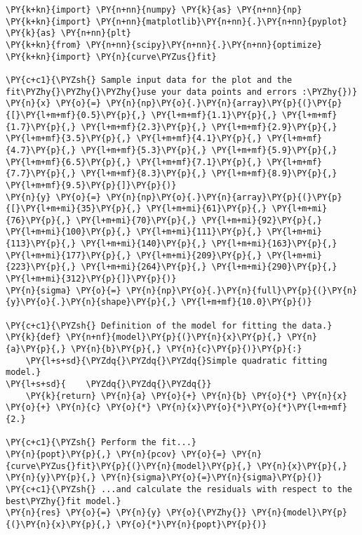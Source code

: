 \begin{Verbatim}[label=\makebox{\href{https://bitbucket.org/lbaldini/statnotes/src/master/snippets/residual\_plot.py}{https://bitbucket.org/.../residual\_plot.py}},commandchars=\\\{\}]
\PY{k+kn}{import} \PY{n+nn}{numpy} \PY{k}{as} \PY{n+nn}{np}
\PY{k+kn}{import} \PY{n+nn}{matplotlib}\PY{n+nn}{.}\PY{n+nn}{pyplot} \PY{k}{as} \PY{n+nn}{plt}
\PY{k+kn}{from} \PY{n+nn}{scipy}\PY{n+nn}{.}\PY{n+nn}{optimize} \PY{k+kn}{import} \PY{n}{curve\PYZus{}fit}

\PY{c+c1}{\PYZsh{} Sample input data for the plot and the fit\PYZhy{}\PYZhy{}\PYZhy{}use your data points and errors :\PYZhy{})}
\PY{n}{x} \PY{o}{=} \PY{n}{np}\PY{o}{.}\PY{n}{array}\PY{p}{(}\PY{p}{[}\PY{l+m+mf}{0.5}\PY{p}{,} \PY{l+m+mf}{1.1}\PY{p}{,} \PY{l+m+mf}{1.7}\PY{p}{,} \PY{l+m+mf}{2.3}\PY{p}{,} \PY{l+m+mf}{2.9}\PY{p}{,} \PY{l+m+mf}{3.5}\PY{p}{,} \PY{l+m+mf}{4.1}\PY{p}{,} \PY{l+m+mf}{4.7}\PY{p}{,} \PY{l+m+mf}{5.3}\PY{p}{,} \PY{l+m+mf}{5.9}\PY{p}{,} \PY{l+m+mf}{6.5}\PY{p}{,} \PY{l+m+mf}{7.1}\PY{p}{,} \PY{l+m+mf}{7.7}\PY{p}{,} \PY{l+m+mf}{8.3}\PY{p}{,} \PY{l+m+mf}{8.9}\PY{p}{,} \PY{l+m+mf}{9.5}\PY{p}{]}\PY{p}{)}
\PY{n}{y} \PY{o}{=} \PY{n}{np}\PY{o}{.}\PY{n}{array}\PY{p}{(}\PY{p}{[}\PY{l+m+mi}{35}\PY{p}{,} \PY{l+m+mi}{61}\PY{p}{,} \PY{l+m+mi}{76}\PY{p}{,} \PY{l+m+mi}{70}\PY{p}{,} \PY{l+m+mi}{92}\PY{p}{,} \PY{l+m+mi}{100}\PY{p}{,} \PY{l+m+mi}{111}\PY{p}{,} \PY{l+m+mi}{113}\PY{p}{,} \PY{l+m+mi}{140}\PY{p}{,} \PY{l+m+mi}{163}\PY{p}{,} \PY{l+m+mi}{177}\PY{p}{,} \PY{l+m+mi}{209}\PY{p}{,} \PY{l+m+mi}{223}\PY{p}{,} \PY{l+m+mi}{264}\PY{p}{,} \PY{l+m+mi}{290}\PY{p}{,} \PY{l+m+mi}{312}\PY{p}{]}\PY{p}{)}
\PY{n}{sigma} \PY{o}{=} \PY{n}{np}\PY{o}{.}\PY{n}{full}\PY{p}{(}\PY{n}{y}\PY{o}{.}\PY{n}{shape}\PY{p}{,} \PY{l+m+mf}{10.0}\PY{p}{)}

\PY{c+c1}{\PYZsh{} Definition of the model for fitting the data.}
\PY{k}{def} \PY{n+nf}{model}\PY{p}{(}\PY{n}{x}\PY{p}{,} \PY{n}{a}\PY{p}{,} \PY{n}{b}\PY{p}{,} \PY{n}{c}\PY{p}{)}\PY{p}{:}
    \PY{l+s+sd}{\PYZdq{}\PYZdq{}\PYZdq{}Simple quadratic fitting model.}
\PY{l+s+sd}{    \PYZdq{}\PYZdq{}\PYZdq{}}
    \PY{k}{return} \PY{n}{a} \PY{o}{+} \PY{n}{b} \PY{o}{*} \PY{n}{x} \PY{o}{+} \PY{n}{c} \PY{o}{*} \PY{n}{x}\PY{o}{*}\PY{o}{*}\PY{l+m+mf}{2.}

\PY{c+c1}{\PYZsh{} Perform the fit...}
\PY{n}{popt}\PY{p}{,} \PY{n}{pcov} \PY{o}{=} \PY{n}{curve\PYZus{}fit}\PY{p}{(}\PY{n}{model}\PY{p}{,} \PY{n}{x}\PY{p}{,} \PY{n}{y}\PY{p}{,} \PY{n}{sigma}\PY{o}{=}\PY{n}{sigma}\PY{p}{)}
\PY{c+c1}{\PYZsh{} ...and calculate the residuals with respect to the best\PYZhy{}fit model.}
\PY{n}{res} \PY{o}{=} \PY{n}{y} \PY{o}{\PYZhy{}} \PY{n}{model}\PY{p}{(}\PY{n}{x}\PY{p}{,} \PY{o}{*}\PY{n}{popt}\PY{p}{)}


\end{Verbatim}
